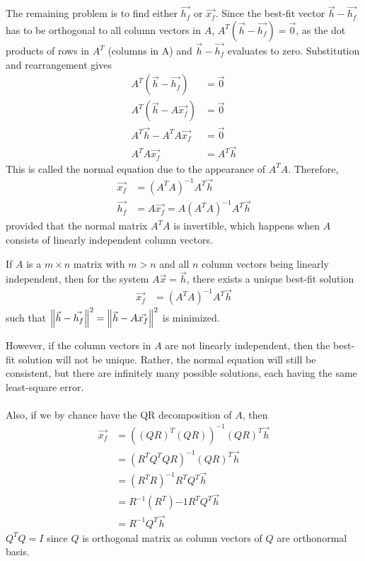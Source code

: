 The remaining problem is to find either $\vec{h_f}$ or $\vec{x_f}$. Since the best-fit vector $\vec{h}-\vec{h_f}$ has to be orthogonal to all column vectors in $A$, $A^T(\vec{h}-\vec{h_f}) = \vec{0}$, as the dot products of rows in $A^T$ (columns in A) and $\vec{h}-\vec{h_f}$ evaluates to zero. Substitution and rearrangement gives
\begin{align*}
A^T(\vec{h}-\vec{h_f}) &= \vec{0} \\
A^T(\vec{h}-A\vec{x_f}) &= \vec{0} \\
A^T\vec{h} - A^TA\vec{x_f} &= \vec{0} \\
A^TA\vec{x_f} &= A^T\vec{h}
\end{align*}
This is called the normal equation due to the appearance of $A^TA$. Therefore,
\begin{align*}
\vec{x_f} &= (A^TA)^{-1}A^T\vec{h} \\  
\vec{h_f} &= A\vec{x_f} = A(A^TA)^{-1}A^T\vec{h}
\end{align*}
provided that the normal matrix $A^T A$ is invertible, which happens when $A$ consists of linearly independent column vectors.
\begin{thm}
\label{bestfit}
If $A$ is a $m \times n$ matrix with $m > n$ and all $n$ column vectors being linearly independent, then for the system $A\vec{x} = \vec{h}$, there exists a unique best-fit solution
\begin{align*}
\vec{x_f} &= (A^TA)^{-1}A^T\vec{h}    
\end{align*}
such that $\norm{\vec{h}-\vec{h_f}}^2 = \norm{\vec{h}-A\vec{x_f}}^2$ is minimized.
\end{thm}
However, if the column vectors in $A$ are not linearly independent, then the best-fit solution will not be unique. Rather, the normal equation will still be consistent, but there are infinitely many possible solutions, each having the same least-square error.\\
\\
Also, if we by chance have the QR decomposition of $A$, then
\begin{align*}
\vec{x_f} &= ((QR)^T(QR))^{-1}(QR)^T\vec{h} \\
&= (R^TQ^TQR)^{-1} (QR)^T\vec{h} \\
&= (R^TR)^{-1} R^TQ^T \vec{h} \\
&= R^{-1} (R^T){-1} R^TQ^T \vec{h} \\
&= R^{-1} Q^T\vec{h}
\end{align*}
$Q^TQ = I$ since $Q$ is orthogonal matrix as column vectors of $Q$ are orthonormal basis.


